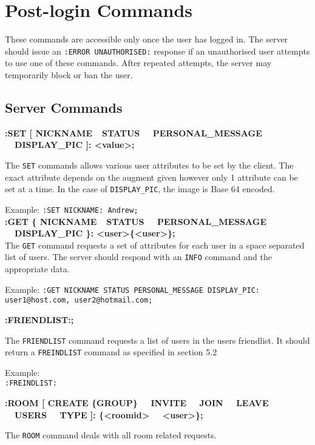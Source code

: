 \section{Post-login Commands}

These commands are accessible only once the user has logged in. The server should issue an \texttt{:ERROR UNAUTHORISED:} response if an unauthorised user attempts to use one of these commands. After repeated attempts, the server may temporarily block or ban the user.

\subsection{Server Commands}

{\bf :SET [ NICKNAME\ \vline \ STATUS \ \vline \ PERSONAL\_MESSAGE \ \vline \ DISPLAY\_PIC ]: <value>;}

The \texttt{SET} commands allows various user attributes to be set by the client. The exact attribute depends on the augment given however only 1 attribute can be set at a time. In the case of \texttt{DISPLAY\_PIC}, the image is Base 64 encoded.

Example:
\texttt{:SET NICKNAME: Andrew;} \\

{\bf :GET \{ NICKNAME\ \vline \ STATUS \ \vline \ PERSONAL\_MESSAGE \ \vline \ DISPLAY\_PIC \}: <user>\{<user>\};} \\

The \texttt{GET} command requests a set of attributes for each user in a space separated list of users. The server should respond with an \texttt{INFO} command and the appropriate data.

Example:
\texttt{:GET NICKNAME STATUS PERSONAL\_MESSAGE DISPLAY\_PIC: user1@host.com, user2@hotmail.com;}

{\bf :FRIENDLIST:;}

The \texttt{FRIENDLIST} command requests a list of users in the users friendlist. It should return a \texttt{FREINDLIST} command as specified in section 5.2

Example: \\
\texttt{:FREINDLIST:} 
	
{\bf :ROOM [ CREATE \{GROUP\} \ \vline \ INVITE \ \vline \ JOIN \ \vline \ LEAVE \ \vline \ USERS \ \vline \ TYPE ]: \{<roomid> \ \vline \ <user>\};}

The \texttt{ROOM} command deals with all room related requests.

